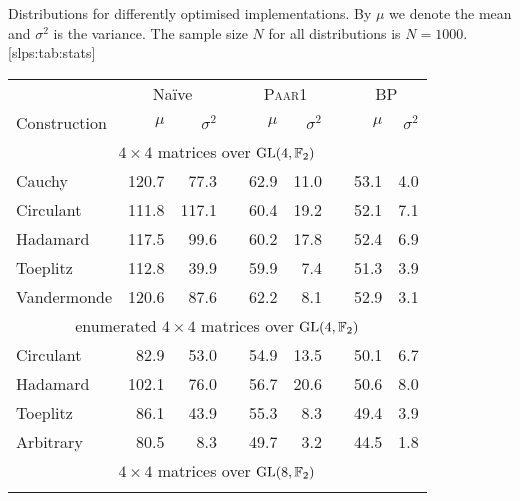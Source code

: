\begin{table}
    \begin{sidecaption}{%
        Distributions for differently optimised implementations.
        By $\mu$ we denote the mean and $\sigma^2$ is the variance.
        The sample size $N$ for all distributions is $N = 1000$.
    }[slps:tab:stats]
    \centering
    \begin{threeparttable}
    \renewcommand{\arraystretch}{1.2}
    \begin{tabular}{lrrcrrcrr}
        \toprule
                          & \multicolumn{2}{c}{Na\"ive} & & \multicolumn{2}{c}{\textsc{Paar1}} & & \multicolumn{2}{c}{\textsc{BP}} \\
        Construction      & $\mu$ &$\sigma^2$& & $\mu$ &$\sigma^2$& &$\mu$&$\sigma^2$\\
        \midrule
        \multicolumn{9}{c}{$4 \times 4$ matrices over $\mathrm{GL}(4, \mathbb{F}_2)$}                      \\ \rowcolor{gray!10}
        \midrule
        Cauchy            & 120.7 &   77.3   & &  62.9 &   11.0  & & 53.1 &    4.0   \\
        Circulant         & 111.8 &  117.1   & &  60.4 &   19.2  & & 52.1 &    7.1   \\ \rowcolor{gray!10}
        Hadamard          & 117.5 &   99.6   & &  60.2 &   17.8  & & 52.4 &    6.9   \\
        Toeplitz          & 112.8 &   39.9   & &  59.9 &    7.4  & & 51.3 &    3.9   \\ \rowcolor{gray!10}
        Vandermonde       & 120.6 &   87.6   & &  62.2 &    8.1  & & 52.9 &    3.1   \\
        \bottomrule
        \toprule
        \multicolumn{9}{c}{enumerated $4 \times 4$ matrices over $\mathrm{GL}(4, \mathbb{F}_2)$}           \\ \rowcolor{gray!10}
        \midrule
        Circulant         &  82.9 &   53.0   & &  54.9 &   13.5  & & 50.1 &    6.7   \\
        Hadamard          & 102.1 &   76.0   & &  56.7 &   20.6  & & 50.6 &    8.0   \\ \rowcolor{gray!10}
        Toeplitz          &  86.1 &   43.9   & &  55.3 &    8.3  & & 49.4 &    3.9   \\
        Arbitrary         &  80.5 &    8.3   & &  49.7 &    3.2  & & 44.5 &    1.8   \\
        \bottomrule
        \toprule
        \multicolumn{9}{c}{$4 \times 4$ matrices over $\mathrm{GL}(8, \mathbb{F}_2)$}                      \\ \rowcolor{gray!10}

\end{tabular}
\end{threeparttable}
\end{sidecaption}
\end{table}
